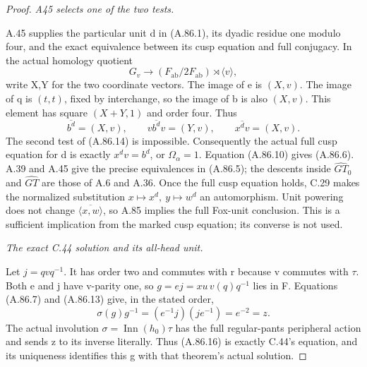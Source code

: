 \begin{proof}
\emph{A45 selects one of the two tests.}\par
A.45 supplies the particular unit d in (A.86.1), its dyadic residue
one modulo four, and the exact equivalence between its cusp equation
and full conjugacy. In the actual homology quotient
\[
       G_v\longrightarrow
       (F_{\mathrm{ab}}/2F_{\mathrm{ab}})\rtimes\langle v\rangle,
\]
write X,Y for the two coordinate vectors. The image of e is \((X,v)\).
The image of q is \((t,t)\), fixed by interchange, so the image of b
is also \((X,v)\). This element has square \((X+Y,1)\) and
order four. Thus
\[
 \overline{b^d}=(X,v),\qquad
 \overline{vb^dv}=(Y,v),\qquad
 \overline{x^dv}=(X,v).
 \tag{A.86.15}
\]
The second test of (A.86.14) is impossible. Consequently the actual
full cusp equation for d is exactly \(x^dv=b^d\), or
\(\Omega_\alpha=1\). Equation (A.86.10) gives (A.86.6).
A.39 and A.45 give the precise equivalences in (A.86.5);
the descents inside \(\widehat{GT}_0\) and
\(\widehat{GT}\) are those of A.6 and A.36. Once the full
cusp equation holds, C.29 makes the normalized substitution
\(x\mapsto x^d,\ y\mapsto w^d\) an automorphism.
Unit powering does not change \(\overline{\langle x,w\rangle}\),
so A.85 implies the full Fox-unit conclusion. This is a sufficient
implication from the marked cusp equation; its converse is not used.

\emph{The exact C.44 solution and its all-head unit.}\par
Let \(j=qvq^{-1}\). It has order two and commutes with r because
v commutes with \(\tau\). Both e and j have v-parity one, so
\(g=ej=xu\,v(q)q^{-1}\) lies in F. Equations (A.86.7) and
(A.86.13) give, in the stated order,
\[
       \sigma(g)g^{-1}=(e^{-1}j)(je^{-1})=e^{-2}=z.
 \tag{A.86.16}
\]
The actual involution \(\sigma=\operatorname{Inn}(h_0)\tau\)
has the full regular-pants peripheral action and sends z to its
inverse literally. Thus (A.86.16) is exactly C.44's equation, and
its uniqueness identifies this g with that theorem's actual solution.


\end{proof}
